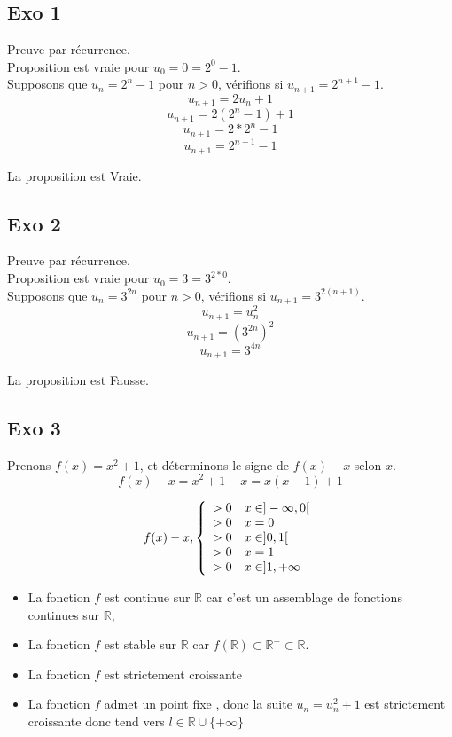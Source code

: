 \documentclass[]{book}
\theoremstyle{definition}
\newcommand{\bb}[1]{\mathbb{#1}}
\newcommand{\R}{\bb{R}}
\begin{document}
\subsection*{Exo 1}
Preuve par r\'ecurrence.\\
Proposition est vraie pour $u_0 = 0 = 2^0 -1$.\\
Supposons que $u_n = 2^n-1$ pour $n>0$, v\'erifions si $u_{n+1} = 2^{n+1} - 1$.
$$u_{n+1} = 2u_n + 1$$
$$u_{n+1} = 2(2^n - 1) + 1$$
$$u_{n+1} = 2*2^n - 1$$
$$u_{n+1} = 2^{n+1} - 1$$

La proposition est Vraie.

\subsection*{Exo 2}
Preuve par r\'ecurrence.\\
Proposition est vraie pour $u_0 = 3 = 3^{2*0}$.\\
Supposons que $u_n = 3^{2n}$ pour $n>0$, v\'erifions si $u_{n+1} = 3^{2(n+1)}$.
$$u_{n+1} = u_n^2$$
$$u_{n+1} = (3^{2n})^2$$
$$u_{n+1} = 3^{4n}$$

La proposition est Fausse.

\subsection*{Exo 3}
Prenons $f(x) = x^2 + 1$, et d\'eterminons le signe de $f(x) - x$ selon $x$.\\
$$f(x) - x = x^2 + 1 -x = x(x-1) + 1$$

$$f(x) - x,
\left\{ 
\begin{array}{l l}
 >0 & x \in ]-\infty,0[\\
 >0 & x = 0\\
 >0 & x \in ]0,1[ \\
 >0 & x = 1\\
 >0 & x \in ]1,+\infty \\ 
\end{array}
\right. 
$$

\begin{itemize} 
\item La fonction $f$ est continue sur $\R$ car c'est un assemblage de fonctions continues sur $\R$,
\item La fonction $f$ est stable sur $\R$ car $f(\R) \subset \R^+ \subset \R$.
\item La fonction $f$ est strictement croissante
\item La fonction $f$ admet un point fixe , donc la suite $u_n = u_n^2 + 1$ est strictement croissante donc tend vers $l \in \R \cup \{+\infty\}$
\end{itemize} 
\end{document}
